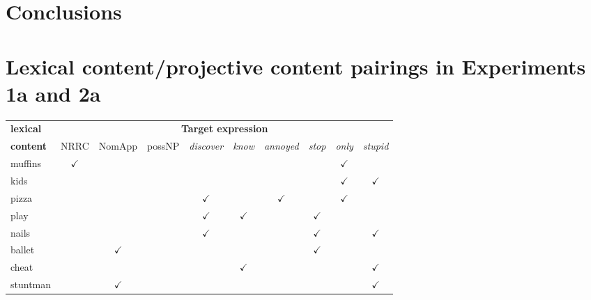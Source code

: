 \documentclass[11pt,fleqn]{article}
\newcommand{\6}{\mbox{$[\hspace*{-.6mm}[$}}
\newcommand{\9}{\mbox{$]\hspace*{-.6mm}]$}}
\begin{document}
\section{Conclusions}\label{s6}

\appendix

\setcounter{table}{0}
\renewcommand{\thetable}{A\arabic{table}}

\section{Lexical content/projective content pairings in Experiments 1a and 2a}\label{a-trigger-content-pairs}

\begin{table}[h!]
\begin{center}
\begin{tabular}{l|ccccccccc}
{\bf lexical} & \multicolumn{9}{c}{\bf Target expression} \\ 
 
{\bf content} & NRRC & NomApp & possNP & {\em discover} & {\em know} & {\em annoyed} & {\em stop} & {\em only} & {\em stupid} \\\hline \hline

muffins & $\checkmark$ & & & & & & & $\checkmark$ &  \\

\hline

kids & & & & & & & & $\checkmark$ & $\checkmark$ \\

\hline

pizza & & & & $\checkmark$ & & $\checkmark$ & & $\checkmark$ &  \\

\hline

play & & & & $\checkmark$ & $\checkmark$ & & $\checkmark$ & &  \\

\hline

nails & & & & $\checkmark$ & & & $\checkmark$ & & $\checkmark$  \\

\hline

ballet & & $\checkmark$& & & & & $\checkmark$ & &  \\

\hline

cheat & & & & & $\checkmark$ & & & & $\checkmark$ \\

\hline

stuntman & & $\checkmark$ & & & & & & & $\checkmark$ \\


\end{tabular}
\end{center}
\end{table}
\end{document}
